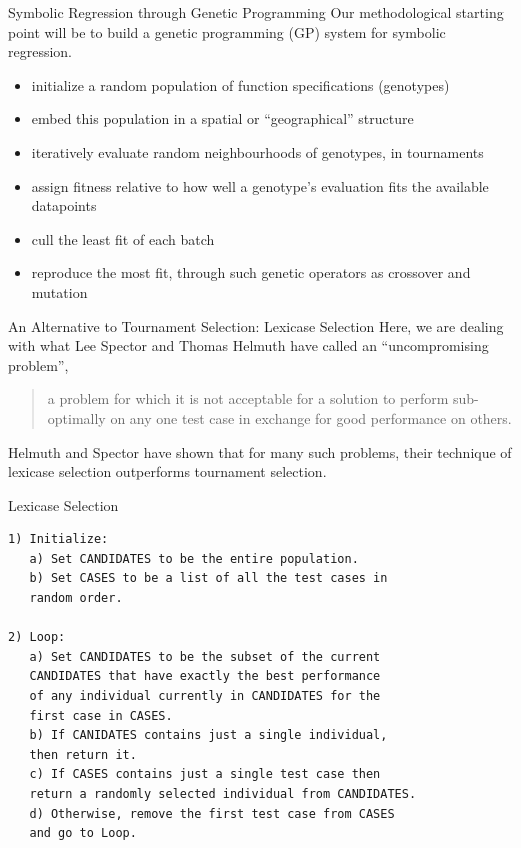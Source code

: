 \documentclass[presentation]{beamer}
\begin{document}
\begin{frame}[label={sec:orge1f5206}]{Symbolic Regression through Genetic Programming}
Our methodological starting point will be to build a genetic programming (GP) system for symbolic regression.

\begin{itemize}
\item initialize a random population of function specifications (\alert{genotypes})
\item embed this population in a spatial or ``\alert{geographical}'' structure
\item iteratively evaluate random neighbourhoods of genotypes, in \alert{tournaments}
\item assign \alert{fitness} relative to how well a genotype's evaluation fits the available datapoints
\item cull the least fit of each batch
\item reproduce the most fit, through such \alert{genetic operators} as crossover and mutation
\end{itemize}
\end{frame}

\begin{frame}[label={sec:org60dbae9}]{An Alternative to Tournament Selection: Lexicase Selection}
Here, we are dealing with what Lee Spector and Thomas Helmuth have called an ``uncompromising problem'',

\begin{quote}
a problem for which it is not acceptable for a solution to perform sub-optimally on any one test case in exchange for good performance on others.
\end{quote}

Helmuth and Spector have shown that for many such problems, their technique of \alert{lexicase selection} outperforms \alert{tournament selection}.
\end{frame}

\begin{frame}[label={sec:org1f58148},fragile]{Lexicase Selection}
 \begin{verbatim}
1) Initialize:
   a) Set CANDIDATES to be the entire population.
   b) Set CASES to be a list of all the test cases in
   random order.

2) Loop:
   a) Set CANDIDATES to be the subset of the current
   CANDIDATES that have exactly the best performance
   of any individual currently in CANDIDATES for the
   first case in CASES.
   b) If CANIDATES contains just a single individual,
   then return it.
   c) If CASES contains just a single test case then
   return a randomly selected individual from CANDIDATES.
   d) Otherwise, remove the first test case from CASES
   and go to Loop.
\end{verbatim}
\end{frame}
\end{document}
